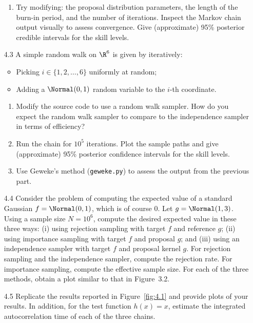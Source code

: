 \begin{enumerate}
\begin{enumerate}
\item Try modifying: the proposal distribution parameters, the length of the burn-in period, and
the number of iterations. Inspect the Markov chain output visually to assess convergence.
Give (approximate) 95\% posterior credible intervals for the skill levels.
\end{enumerate}

\item[4.3] A simple random walk on $\R^6$ is given by iteratively:
\begin{itemize}
  \item Picking $i \in \{1, 2, \ldots, 6\}$ uniformly at random;
  \item Adding a $\Normal(0,1)$ random variable to the $i$-th coordinate.
\end{itemize}
\begin{enumerate}
\item Modify the source code to use a random walk sampler. How do you expect the random
walk sampler to compare to the independence sampler in terms of efficiency?

\item Run the chain for $10^5$ iterations. Plot the sample paths and give (approximate) 95\% posterior confidence intervals for the skill levels.

\item Use Geweke's method (\texttt{geweke.py}) to assess the output from the previous part.
\end{enumerate}

\item[4.4] Consider the problem of computing the expected value of a standard Gaussian
$f = \Normal(0,1)$, which is of course 0. Let $g = \Normal(1,3)$. Using a sample size $N = 10^6$, compute the desired expected value in these three ways: (i) using rejection sampling with target $f$
and reference $g$; (ii) using importance sampling with target $f$ and proposal $g$; and (iii) using an
independence sampler with target $f$ and proposal kernel $g$. For rejection sampling and the independence sampler, compute the rejection rate. For importance sampling, compute the effective
sample size. For each of the three methods, obtain a plot similar to that in Figure~3.2.

\item[4.5] Replicate the results reported in Figure~\ref{fig:4.1} and provide plots of your results. In
addition, for the test function $h(x) = x$, estimate the integrated autocorrelation time of each of
the three chains.


\end{enumerate}
